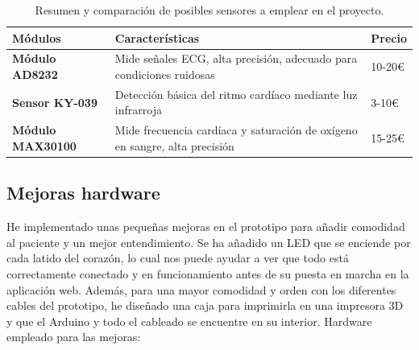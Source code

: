 \begin{table}[h]
	\centering
	\begin{tabularx}{\linewidth}{ p{} p{} p{} }
		\toprule
		\textbf{Módulos} & \textbf{Características} & \textbf{Precio} \\
		\toprule
		\textbf{Módulo AD8232} & Mide señales ECG, alta precisión, adecuado para condiciones ruidosas & 10-20€ \\
		\textbf{Sensor KY-039} & Detección básica del ritmo cardíaco mediante luz infrarroja & 3-10€ \\
		\textbf{Módulo MAX30100} & Mide frecuencia cardíaca y saturación de oxígeno en sangre, alta precisión & 15-25€ \\
		\bottomrule
	\end{tabularx}
	\caption{Resumen y comparación de posibles sensores a emplear en el proyecto.}
	\label{tab:camparacion}
\end{table}


\subsection{Mejoras hardware}

He implementado unas pequeñas mejoras en el prototipo para añadir comodidad al paciente y un mejor entendimiento. Se ha añadido un LED que se enciende por cada latido del corazón, lo cual nos puede ayudar a ver que todo está correctamente conectado y en funcionamiento antes de su puesta en marcha en la aplicación web. Además, para una mayor comodidad y orden con los diferentes cables del prototipo, he diseñado una caja para imprimirla en una impresora 3D y que el Arduino y todo el cableado se encuentre en su interior. Hardware empleado para las mejoras:

